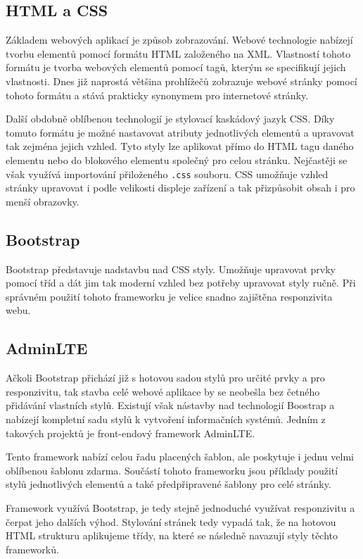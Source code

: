\documentclass[czech,BP]{thesiskiv}
\begin{document}
	\subsection{HTML a CSS}
		\par Základem webových aplikací je způsob zobrazování. Webové technologie nabízejí tvorbu elementů pomocí formátu HTML založeného na XML. Vlastností tohoto formátu je tvorba webových elementů pomocí tagů, kterým se specifikují jejich vlastnosti. Dnes již naprostá většina prohlížečů zobrazuje webové stránky pomocí tohoto formátu a stává prakticky synonymem pro internetové stránky.
		\par Další obdobně oblíbenou technologií je stylovací kaskádový jazyk CSS. Díky tomuto formátu je možné nastavovat atributy jednotlivých elementů a upravovat tak zejména jejich vzhled. Tyto styly lze aplikovat přímo do HTML tagu daného elementu nebo do blokového elementu společný pro celou stránku. Nejčastěji se však využívá importování přiloženého \texttt{.css} souboru. CSS umožňuje vzhled stránky upravovat i podle velikosti displeje zařízení a tak přizpůsobit obsah i pro menší obrazovky.
	\subsection{Bootstrap}
		\par Bootstrap představuje nadstavbu nad CSS styly. Umožňuje upravovat prvky pomocí tříd a dát jim tak moderní vzhled bez potřeby upravovat styly ručně. Při správném použití tohoto frameworku je velice snadno zajištěna responzivita webu.
	\subsection{AdminLTE}
		Ačkoli Bootstrap přichází již s hotovou sadou stylů pro určité prvky a pro responzivitu, tak stavba celé webové aplikace by se neobešla bez četného přidávání vlastních stylů. Existují však nástavby nad technologií Boostrap a nabízejí kompletní sadu stylů k vytvoření informačních systémů. Jedním z takových projektů je front-endový framework AdminLTE. 
		\par Tento framework nabízí celou řadu placených šablon, ale poskytuje i jednu velmi oblíbenou šablonu zdarma. Součástí tohoto frameworku jsou příklady použití stylů jednotlivých elementů a také předpřipravené šablony pro celé stránky.
		\par Framework využívá Bootstrap, je tedy stejně jednoduché využívat responzivitu a čerpat jeho dalších výhod. Stylování stránek tedy vypadá tak, že na hotovou HTML strukturu aplikujeme třídy, na které se následně navazují styly těchto frameworků. 
\end{document}
